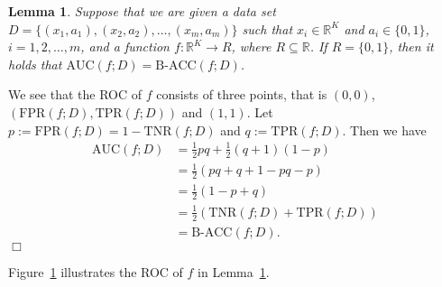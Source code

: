 \documentclass[a4paper,12pt,dvipdfmx]{article}
\newcommand{\figref}[1]{Figure~\ref{fig:#1}}
\newcommand{\lemref}[1]{Lemma~\ref{lem:#1}}
\newtheorem{lem}{Lemma}
\newenvironment{proof}{\medskip
  \noindent{\scshape Proof:}}{\quad $\Box$\medskip}
\begin{document}
\begin{lem}
  \label{lem:auc}
  Suppose that we are given a data set $D=\{(x_1,a_1),(x_2,a_2),\dots,(x_m,a_m)\}$ such that $x_i\in\mathbb{R}^K$ and $a_i\in\{0,1\}$, $i=1,2,\dots,m$, and a function $f:\mathbb{R}^K\to R$, where $R\subseteq\mathbb{R}$.
  If $R=\{0,1\}$, then
  it holds that $\textrm{AUC}(f;D)=\textrm{B-ACC}(f;D)$. 
\end{lem}
\begin{proof}
  We see that the ROC of $f$ consists of
  three points, that is $(0,0)$, $(\mathrm{FPR}(f;D),\mathrm{TPR}(f;D))$ and $(1,1)$.
  Let $p:=\mathrm{FPR}(f;D)=1-\mathrm{TNR}(f;D)$
  and $q:=\mathrm{TPR}(f;D)$.
  Then we have
  \begin{align*}
    \textrm{AUC}(f;D) &= \frac{1}{2}pq + \frac{1}{2}(q+1)(1-p)\\
    &=\frac{1}{2}(pq+q+1-pq-p)\\
    &=\frac{1}{2}(1-p+q)\\
    &=\frac{1}{2}(\mathrm{TNR}(f;D) + \mathrm{TPR}(f;D))\\
    &=\textrm{B-ACC}(f;D). 
  \end{align*}
  \hfill
\end{proof}

\figref{auc} illustrates the ROC of $f$
in \lemref{auc}. 

\begin{figure}[h]
  \label{fig:auc}
  \centering
  \end{figure}
\end{document}
